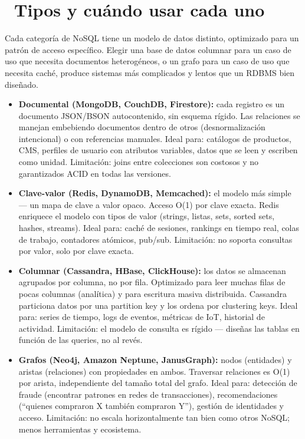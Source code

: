 \section[Tipos y cuándo usar cada uno]{~Tipos y cuándo usar cada uno}

Cada categoría de NoSQL tiene un modelo de datos distinto, optimizado para un patrón de acceso específico.
Elegir una base de datos columnar para un caso de uso que necesita documentos heterogéneos, o un grafo para un caso de uso que necesita caché, produce sistemas más complicados y lentos que un RDBMS bien diseñado.

\begin{itemize}
  \item \textbf{Documental (MongoDB, CouchDB, Firestore):} cada registro es un documento JSON/BSON autocontenido, sin esquema rígido.
    Las relaciones se manejan embebiendo documentos dentro de otros (desnormalización intencional) o con referencias manuales.
    Ideal para: catálogos de productos, CMS, perfiles de usuario con atributos variables, datos que se leen y escriben como unidad.
    Limitación: joins entre colecciones son costosos y no garantizados ACID en todas las versiones.

  \item \textbf{Clave-valor (Redis, DynamoDB, Memcached):} el modelo más simple — un mapa de clave a valor opaco.
    Acceso O(1) por clave exacta. Redis enriquece el modelo con tipos de valor (strings, listas, sets, sorted sets, hashes, streams).
    Ideal para: caché de sesiones, rankings en tiempo real, colas de trabajo, contadores atómicos, pub/sub.
    Limitación: no soporta consultas por valor, solo por clave exacta.

  \item \textbf{Columnar (Cassandra, HBase, ClickHouse):} los datos se almacenan agrupados por columna, no por fila.
    Optimizado para leer muchas filas de pocas columnas (analítica) y para escritura masiva distribuida.
    Cassandra particiona datos por una partition key y los ordena por clustering keys.
    Ideal para: series de tiempo, logs de eventos, métricas de IoT, historial de actividad.
    Limitación: el modelo de consulta es rígido — diseñas las tablas en función de las queries, no al revés.

  \item \textbf{Grafos (Neo4j, Amazon Neptune, JanusGraph):} nodos (entidades) y aristas (relaciones) con propiedades en ambos.
    Traversar relaciones es O(1) por arista, independiente del tamaño total del grafo.
    Ideal para: detección de fraude (encontrar patrones en redes de transacciones), recomendaciones (``quienes compraron X también compraron Y''), gestión de identidades y acceso.
    Limitación: no escala horizontalmente tan bien como otros NoSQL; menos herramientas y ecosistema.
\end{itemize}

